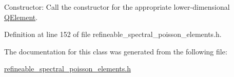 Constructor\+: Call the constructor for the appropriate lower-\/dimensional \hyperlink{classoomph_1_1QElement}{Q\+Element}. 



Definition at line 152 of file refineable\+\_\+spectral\+\_\+poisson\+\_\+elements.\+h.



The documentation for this class was generated from the following file\+:\begin{DoxyCompactItemize}
\item 
\hyperlink{refineable__spectral__poisson__elements_8h}{refineable\+\_\+spectral\+\_\+poisson\+\_\+elements.\+h}\end{DoxyCompactItemize}
